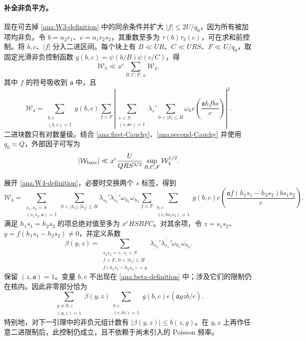 \paragraph{补全非负平方。}
现在可去掉 \eqref{ana:W3-definition} 中的同余条件并扩大 $|f|\le2U/q_0$，因为所有被加项均非负。令 $b=n_2r_1$、$c=n_1r_2s_2$，其重数至多为 $\tau(b)\tau_3(c)$，可在求和前控制。将 $b,c$、$|f|$ 分入二进区间。每个块上有 $B\ll UR$、$C\ll URS$、$F\ll U/q_0$，取固定光滑非负控制函数 $g(b,c)=\psi(b/B)\psi(c/C)$，得
\begin{equation}\label{ana:second-Cauchy}
 \mathcal W_3\ll x^\epsilon\sum_{B,C,F,\pm}\mathcal W_4,
\end{equation}
其中 $f$ 的符号吸收到 $\mathfrak{a}$ 中，且
\begin{equation}\label{ana:W4-definition}
 \mathcal W_4=
 \sum_{\substack{b,c\\(b,c)=1}}g(b,c)
 \sum_{f\asymp F}
 \left|\sum_{\substack{s\asymp S\\(s,\mathfrak{a}c)=1}}
 \lambda_s'\sum_{0<|h|\le H}\omega_h
 e\left(\frac{\mathfrak{a}hf\overline{bs}}c\right)\right|^2.
\end{equation}
二进块数只有对数量级。结合 \eqref{ana:first-Cauchy}、\eqref{ana:second-Cauchy} 并使用 $q_0\asymp Q$，外部因子可写为
\begin{equation}\label{ana:bare-Cauchy-factor}
 |\mathcal W_{\rm bare}|
 \ll x^\epsilon\frac{U}{QRS^{3/2}}
       \sup_{B,C,F}\mathcal W_4^{1/2}.
\end{equation}

展开 \eqref{ana:W4-definition}，必要时交换两个 $s$ 标签，得到
\begin{equation}\label{ana:W4-expansion}
 \mathcal W_4=
 \sum_{\substack{s_1,s_2\asymp S\\(s_1s_2,\mathfrak{a})=1}}
 \sum_{0<|h_1|,|h_2|\le H}\lambda_{s_2}'\overline{\lambda_{s_1}'}
       \omega_{h_1}\overline{\omega_{h_2}}
 \sum_{f\asymp F}\sum_{\substack{b,c\\(c,bs_1s_2)=1}}
 g(b,c)e\left(\frac{\mathfrak{a}f(h_1s_1-h_2s_2)\overline{bs_1s_2}}c\right).
\end{equation}
满足 $h_1s_1=h_2s_2$ 的项总绝对值至多为 $x^\epsilon HSBFC$。对其余项，令 $z=s_1s_2$、$y=f(h_1s_1-h_2s_2)\ne0$，并定义系数
\begin{equation}\label{ana:beta-definition}
 \beta(y,z)=
 \sum_{\substack{s_1s_2=z,\ s_i\asymp S\\
       f\asymp F,\ 0<|h_i|\le H\\
       f(h_1s_1-h_2s_2)=y}}
 \lambda_{s_2}'\overline{\lambda_{s_1}'}
       \omega_{h_1}\overline{\omega_{h_2}}.
\end{equation}
保留 $(z,\mathfrak{a})=1$。变量 $b,c$ 不出现在 \eqref{ana:beta-definition} 中；涉及它们的限制仍在核内。因此非零部分恰为
\begin{equation}\label{ana:off-diagonal-kernel}
 \sum_{\substack{y\ne0,z\\(\mathfrak{a},z)=1}}\beta(y,z)
 \sum_{\substack{b,c\\(c,bz)=1}}g(b,c)
                         e(\mathfrak{a}y\overline{zb}/c).
\end{equation}
特别地，对下一引理中的非负元组计数有 $|\beta(y,z)|\le b(z,y)$。在 $y,z$ 上再作任意二进限制后，此控制仍成立，且不依赖于尚未引入的 Poisson 频率。

